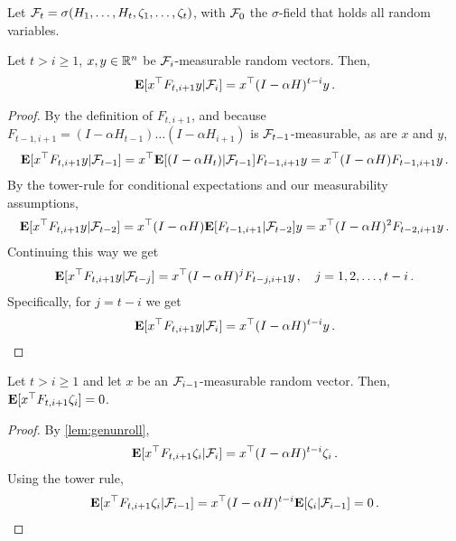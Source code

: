 Let $\mathcal{F}_t = \sigma( H_1,\dots,H_t, \zeta_1,\dots,\zeta_t ) $, with $\mathcal{F}_0$ the $\sigma$-field that holds all random variables.
\newcommand{\cF}{\F}
\begin{lemma}\label{lem:genunroll}
Let $t>i\ge 1$, $x,y\in \mathbb{R}^n$ be $\mathcal{F}_{i}$-measurable random vectors. Then, 
\begin{align*}
\mathbf{E}[x^\top F_{t,i+1}y|\mathcal{F}_i]=x^\top (I-\alpha H)^{t-i} y\,.
\end{align*}
\end{lemma}
\begin{proof}
By the definition of $F_{t,i+1}$, 
and because $F_{t-1,i+1} = (I-\alpha H_{t-1}) \dots (I-\alpha H_{i+1})$ is $\cF_{t-1}$-measurable,
as are $x$ and $y$,
\begin{align*}
 \EE{x^\top F_{t,i+1} y | \cF_{t-1} } = x^\top \EE{ (I-\alpha H_t) | \cF_{t-1} } F_{t-1,i+1} y
=x^\top  (I-\alpha H)  F_{t-1,i+1} y\,.
\end{align*}
By the tower-rule for conditional expectations and our measurability assumptions,
\begin{align*}
\EE{x^\top F_{t,i+1} y | \cF_{t-2} } 
=x^\top  (I-\alpha H)  \EE{F_{t-1,i+1} |\cF_{t-2}} y
= x^\top (I-\alpha H)^2 F_{t-2,i+1} y\,.
\end{align*}
Continuing this way we get
\begin{align*}
\EE{x^\top F_{t,i+1} y | \cF_{t-j} } 
= x^\top (I-\alpha H)^j F_{t-j,i+1} y\,, \quad j=1,2,\dots,t-i\,.
\end{align*}
Specifically, for $j=t-i$ we get
\begin{align*}
\EE{x^\top F_{t,i+1} y | \cF_{i} }  = x^\top (I-\alpha H)^{t-i} y\,.
\end{align*}
\end{proof}

\begin{lemma}\label{noisecancel}
Let $t>i\ge 1$ and let $x$ be an $\mathcal{F}_{i-1}$-measurable random vector. Then,
$\mathbf{E}[x^\top F_{t,i+1}\zeta_{i}]=0$.
\end{lemma}
\begin{proof}
By \cref{lem:genunroll},
\begin{align*}
\EE{x^\top F_{t,i+1} \zeta_i | \cF_{i} }  = x^\top (I-\alpha H)^{t-i} \zeta_i\,.
\end{align*}
Using the tower rule,
\begin{align*}
\EE{x^\top F_{t,i+1} \zeta_i | \cF_{i-1} } 
 = x^\top (I-\alpha H)^{t-i}\EE{ \zeta_i | \cF_{i-1} }= 0\,.
\end{align*}
\end{proof}

